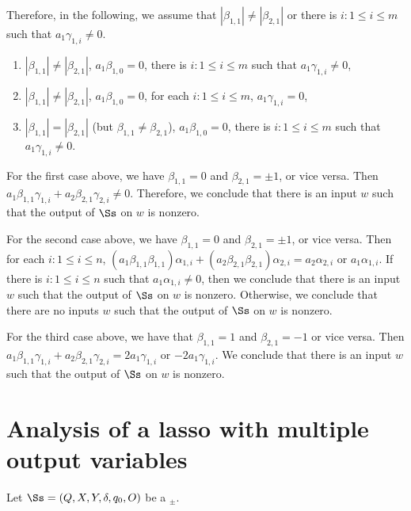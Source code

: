 Therefore, in the following, we assume that $|\beta_{1,1}| \neq |\beta_{2,1}|$ or there is $i: 1 \le i \le m$ such that $a_1 \gamma_{1,i} \neq 0$. 
\begin{enumerate}
\item $|\beta_{1,1}| \neq |\beta_{2,1}|$, $a_1 \beta_{1,0} = 0$, there is $i: 1 \le i \le m$ such that $a_1 \gamma_{1,i} \neq 0$,
\item $|\beta_{1,1}| \neq |\beta_{2,1}|$, $a_1 \beta_{1,0} = 0$, for each $i: 1 \le i \le m$, $a_1 \gamma_{1,i} = 0$,
\item $|\beta_{1,1}| = |\beta_{2,1}|$ (but $\beta_{1,1} \neq \beta_{2,1}$), $a_1 \beta_{1,0} = 0$, there is $i: 1 \le i \le m$ such that $a_1 \gamma_{1,i} \neq 0$.
\end{enumerate}

For the first case above, we have $\beta_{1,1}=0$ and $\beta_{2,1} = \pm 1$, or vice versa. Then $a_1 \beta_{1,1} \gamma_{1,i} + a_2 \beta_{2,1} \gamma_{2,i} \neq 0$. Therefore, we conclude that  there is an input $w$ such that the output of $\Ss$ on $w$ is nonzero.

For the second case above, we have $\beta_{1,1}=0$ and $\beta_{2,1} = \pm 1$, or vice versa. Then for each $i: 1 \le i \le n$, $(a_1 \beta_{1,1} \beta_{1,1})\alpha_{1,i}+(a_2 \beta_{2,1} \beta_{2,1} ) \alpha_{2,i} = a_2  \alpha_{2,i}$ or $a_1 \alpha_{1,i}$. If there is $i: 1 \le i \le n$ such that $a_1 \alpha_{1,i} \neq 0$, then we conclude that  there is an input $w$ such that the output of $\Ss$ on $w$ is nonzero. Otherwise, we conclude that there are no inputs $w$ such that the output of $\Ss$ on $w$ is nonzero.

For the third case above, we have that $\beta_{1,1} = 1$ and $\beta_{2,1} =-1$ or vice versa. Then $a_1 \beta_{1,1}\gamma_{1,i} + a_2 \beta_{2,1} \gamma_{2,i} = 2a_1 \gamma_{1,i}$ or $-2a_1 \gamma_{1,i}$. We conclude that  there is an input $w$ such that the output of $\Ss$ on $w$ is nonzero.



\section{Analysis of a lasso with multiple output variables}

Let $\Ss=(Q, X, Y, \delta, q_0, O)$ be a \SDSIT$_{\pm}$. 

